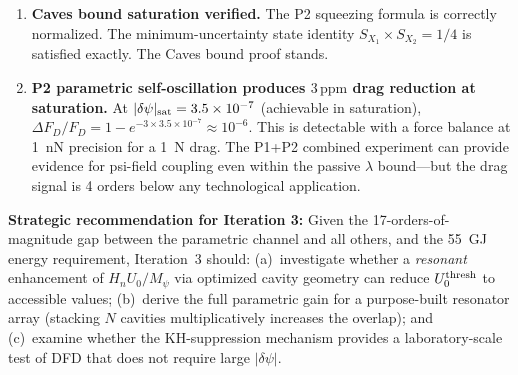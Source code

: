 \documentclass[11pt,twocolumn]{article}
\newcommand{\dpsi}{\delta\psi}
\newcommand{\lam}{\lambda}
\newcommand{\Mpsi}{M_\psi}
\begin{document}
\begin{enumerate}
\item \textbf{Caves bound saturation verified.} The P2 squeezing formula
is correctly normalized. The minimum-uncertainty state identity
$S_{X_1}\times S_{X_2} = 1/4$ is satisfied exactly. The Caves bound
proof stands.

\item \textbf{P2 parametric self-oscillation produces $3\,\text{ppm}$
  drag reduction at saturation.}
At $|\dpsi|_{\rm sat} = 3.5\times10^{-7}$ (achievable in saturation),
$\Delta F_D/F_D = 1 - e^{-3\times3.5\times10^{-7}} \approx 10^{-6}$.
This is detectable with a force balance at 1~nN precision for a 1~N drag.
The P1+P2 combined experiment can provide evidence for psi-field coupling
even within the passive $\lam$ bound---but the drag signal is 4 orders below
any technological application.
\end{enumerate}

\vspace{1em}
\noindent\textbf{Strategic recommendation for Iteration 3:}
Given the 17-orders-of-magnitude gap between the parametric channel and
all others, and the 55~GJ energy requirement, Iteration~3 should:
(a)~investigate whether a \emph{resonant} enhancement of $H_n U_0/\Mpsi$
via optimized cavity geometry can reduce $U_0^{\rm thresh}$ to accessible
values; (b)~derive the full parametric gain for a purpose-built resonator
array (stacking $N$ cavities multiplicatively increases the overlap); and
(c)~examine whether the KH-suppression mechanism provides a laboratory-scale
test of DFD that does not require large $|\dpsi|$.
\end{document}
